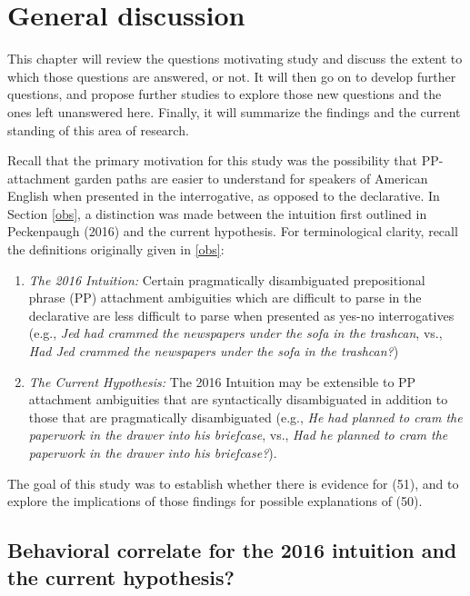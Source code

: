 \documentclass[12pt,oneside]{book}
\begin{document}
\clearpage

\hypertarget{general-discussion}{%
\chapter{General discussion}\label{general-discussion}}

This chapter will review the questions motivating  study  and discuss the extent to which those questions are answered, or not. It will then go on to develop further questions, and propose further studies to explore those new questions and the ones left unanswered here. Finally, it will summarize the findings and the current standing of this area of research.

Recall that the primary motivation for this study was the possibility that PP-attachment garden paths are easier to understand for speakers of American English when presented in the interrogative, as opposed to the declarative. In Section \ref{obs}, a distinction was made between the intuition first outlined in Peckenpaugh (2016) and the current hypothesis. For terminological clarity, recall the definitions originally given in \ref{obs}:

\begin{enumerate}
\def\labelenumi{(\arabic{enumi})}
\setcounter{enumi}{49}
\item
  \emph{The 2016 Intuition:} Certain pragmatically disambiguated prepositional phrase (PP) attachment ambiguities which are difficult to parse in the declarative are less difficult to parse when presented as yes-no interrogatives (e.g., \emph{Jed had crammed the newspapers under the sofa in the trashcan}, vs., \emph{Had Jed crammed the newspapers under the sofa in the trashcan?})
\item
  \emph{The Current Hypothesis:} The 2016 Intuition may be extensible to PP attachment ambiguities that are syntactically disambiguated in addition to those that are pragmatically disambiguated (e.g., \emph{He had planned to cram the paperwork in the drawer into his briefcase}, vs., \emph{Had he planned to cram the paperwork in the drawer into his briefcase?}).
\end{enumerate}

The goal of this study was to establish whether there is evidence for (51), and to explore the implications of those findings for possible explanations of (50).

\hypertarget{behavioral-correlate-for-the-2016-intuition-and-the-current-hypothesis}{%
\section{Behavioral correlate for the 2016 intuition and the current hypothesis?}\label{behavioral-correlate-for-the-2016-intuition-and-the-current-hypothesis}}
\end{document}
